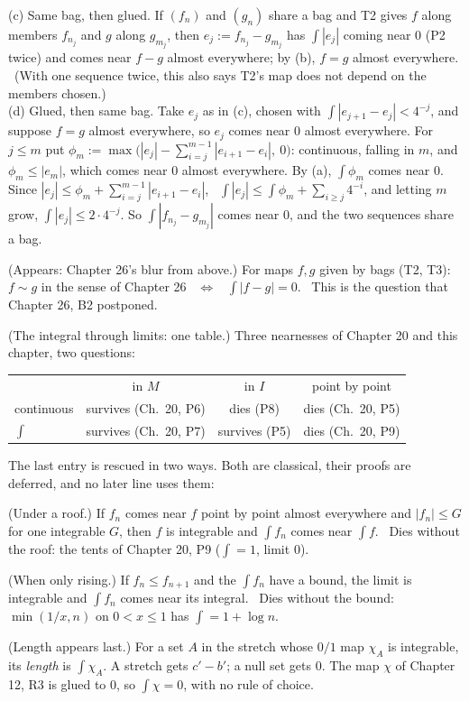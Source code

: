 \begin{lines}
(c) Same bag, then glued. If $(f_n)$ and $(g_n)$ share a bag and T2 gives $f$ along members $f_{n_j}$ and $g$ along $g_{m_j}$, then $e_j := f_{n_j} - g_{m_j}$ has $\int |e_j|$ coming near $0$ (P2 twice) and comes near $f - g$ almost everywhere; by (b), $f = g$ almost everywhere. \ (With one sequence twice, this also says T2's map does not depend on the members chosen.) \\
(d) Glued, then same bag. Take $e_j$ as in (c), chosen with $\int |e_{j+1} - e_j| < 4^{-j}$, and suppose $f = g$ almost everywhere, so $e_j$ comes near $0$ almost everywhere. For $j \le m$ put $\phi_m := \max\bigl(|e_j| - \sum_{i=j}^{m-1} |e_{i+1} - e_i|,\ 0\bigr)$: continuous, falling in $m$, and $\phi_m \le |e_m|$, which comes near $0$ almost everywhere. By (a), $\int \phi_m$ comes near $0$. Since $|e_j| \le \phi_m + \sum_{i=j}^{m-1} |e_{i+1} - e_i|$, \ $\int |e_j| \le \int \phi_m + \sum_{i \ge j} 4^{-i}$, and letting $m$ grow, $\int |e_j| \le 2 \cdot 4^{-j}$. So $\int |f_{n_j} - g_{m_j}|$ comes near $0$, and the two sequences share a bag.
\item[\lab{T4}] (Appears: Chapter 26's blur from above.) For maps $f, g$ given by bags (T2, T3): \ $f \sim g$ in the sense of Chapter 26 \ $\iff$ \ $\int |f - g| = 0$. \ This is the question that Chapter 26, B2 postponed.
\item[\lab{T5}] (The integral through limits: one table.) Three nearnesses of Chapter 20 and this chapter, two questions:
\begin{center}
\begin{tabular}{lccc}
 & in $M$ & in $I$ & point by point \\
continuous & survives (Ch.\ 20, P6) & dies (P8) & dies (Ch.\ 20, P5) \\
$\int$ & survives (Ch.\ 20, P7) & survives (P5) & dies (Ch.\ 20, P9) \\
\end{tabular}
\end{center}
The last entry is rescued in two ways. Both are classical, their proofs are deferred, and no later line uses them:
\item[\lab{T5.1}] (Under a roof.) If $f_n$ comes near $f$ point by point almost everywhere and $|f_n| \le G$ for one integrable $G$, then $f$ is integrable and $\int f_n$ comes near $\int f$. \ Dies without the roof: the tents of Chapter 20, P9 ($\int = 1$, limit $0$).
\item[\lab{T5.2}] (When only rising.) If $f_n \le f_{n+1}$ and the $\int f_n$ have a bound, the limit is integrable and $\int f_n$ comes near its integral. \ Dies without the bound: $\min(1/x, n)$ on $0 < x \le 1$ has $\int = 1 + \log n$.
\item[\lab{T6}] (Length appears last.) For a set $A$ in the stretch whose $0/1$ map $\chi_A$ is integrable, its \emph{length} is $\int \chi_A$. A stretch gets $c' - b'$; a null set gets $0$. The map $\chi$ of Chapter 12, R3 is glued to $0$, so $\int \chi = 0$, with no rule of choice.
\end{lines}

